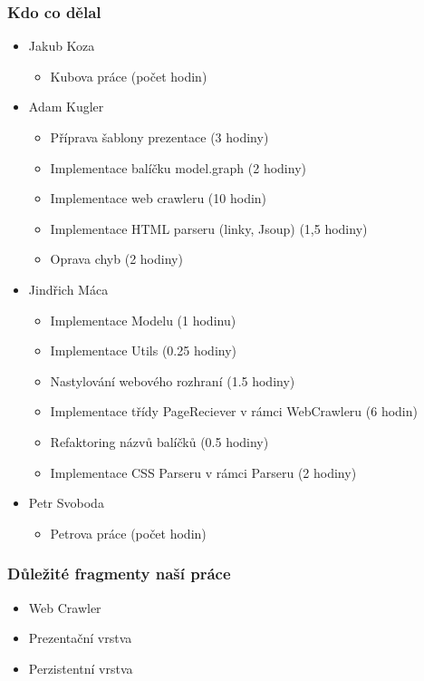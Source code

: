 \documentclass{beamer}
\begin{document}
\begin{frame}[allowframebreaks]\frametitle{Kdo co dělal} 
  \begin{itemize}
    \item Jakub Koza
      \begin{itemize}
       \item Kubova práce (počet hodin)
     \end{itemize}    

    \item Adam Kugler
      \begin{itemize}
       \item Příprava šablony prezentace (3 hodiny)
       \item Implementace balíčku model.graph (2 hodiny)
       \item Implementace web crawleru (10 hodin)
       \item Implementace HTML parseru (linky, Jsoup) (1,5 hodiny)
       \item Oprava chyb (2 hodiny)
     \end{itemize}

    \item Jindřich Máca
      \begin{itemize}
       \item Implementace Modelu (1 hodinu)
			 \item Implementace Utils (0.25 hodiny)
			 \item Nastylování webového rozhraní (1.5 hodiny)
			 \item Implementace třídy PageReciever v rámci WebCrawleru (6 hodin)
			 \item Refaktoring názvů balíčků (0.5 hodiny)
			 \item Implementace CSS Parseru v rámci Parseru (2 hodiny)
     \end{itemize}

    \item Petr Svoboda
      \begin{itemize}
       \item Petrova práce (počet hodin)
     \end{itemize}
   \end{itemize}  
\end{frame} 

\begin{frame}[allowframebreaks]\frametitle{Důležité fragmenty naší práce}
  \begin{itemize}
    \item Web Crawler
		\item Prezentační vrstva
		\item Perzistentní vrstva
  \end{itemize}
\end{frame}
\end{document}
